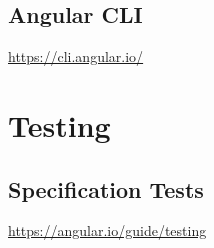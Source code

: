 \documentclass[]{book}
\theoremstyle{definition}
\theoremstyle{definition}
\theoremstyle{definition}
\theoremstyle{remark}
\begin{document}
\subsection{Angular CLI}\label{angular-cli-1}

\url{https://cli.angular.io/}

\section{Testing}\label{testing}

\subsection{Specification Tests}\label{specification-tests}

\url{https://angular.io/guide/testing}


\end{document}

